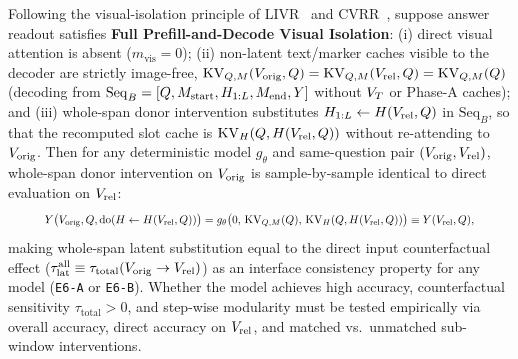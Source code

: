 \begin{proposition}
\label{prop:isolation}
\label{subsec:prop3}
Following the visual-isolation principle of LIVR~\cite{li2026livr} and CVRR~\cite{park2026cvrr}, suppose answer readout satisfies \textbf{Full Prefill-and-Decode Visual Isolation}:
(i) direct visual attention is absent ($m_{\mathrm{vis}} = 0$);
(ii) non-latent text/marker caches visible to the decoder are strictly image-free, $\mathrm{KV}_{Q,M}(V_{\mathrm{orig}}, Q) = \mathrm{KV}_{Q,M}(V_{\mathrm{rel}}, Q) = \mathrm{KV}_{Q,M}(Q)$ (decoding from $\mathrm{Seq}_B = [Q, M_{\mathrm{start}}, H_{1:L}, M_{\mathrm{end}}, Y]$ without $V_T$ or Phase-A caches); and
(iii) whole-span donor intervention substitutes $H_{1:L} \leftarrow H(V_{\mathrm{rel}}, Q)$ in $\mathrm{Seq}_B$, so that the recomputed slot cache is $\mathrm{KV}_H(Q, H(V_{\mathrm{rel}}, Q))$ without re-attending to $V_{\mathrm{orig}}$.
Then for any deterministic model $g_\theta$ and same-question pair $(V_{\mathrm{orig}}, V_{\mathrm{rel}})$, whole-span donor intervention on $V_{\mathrm{orig}}$ is sample-by-sample identical to direct evaluation on $V_{\mathrm{rel}}$:
\begin{equation}
  \resizebox{0.89\linewidth}{!}{$\displaystyle Y\big(\Vorig, Q, \Do(H \leftarrow H(\Vrel, Q))\big) = g_\theta\big(0,\, \KV_{Q,M}(Q),\, \KV_H(Q, H(\Vrel, Q))\big) \equiv Y(\Vrel, Q),$}
  \label{eq:exact_equiv}
\end{equation}
making whole-span latent substitution equal to the direct input counterfactual effect ($\tau_{\mathrm{lat}}^{\mathrm{all}} \equiv \tau_{\mathrm{total}}(V_{\mathrm{orig}} \to V_{\mathrm{rel}})$) as an interface consistency property for any model (\texttt{E6-A} or \texttt{E6-B}). Whether the model achieves high accuracy, counterfactual sensitivity $\tau_{\mathrm{total}} > 0$, and step-wise modularity must be tested empirically via overall accuracy, direct accuracy on $V_{\mathrm{rel}}$, and matched vs.\ unmatched sub-window interventions.
\end{proposition}
